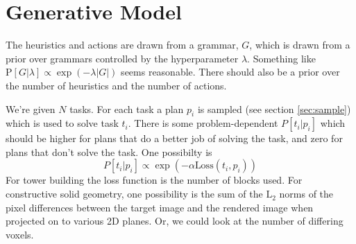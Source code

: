 \documentclass{article}
\begin{document}
\section{Generative Model}
The heuristics and actions are drawn from a grammar, $G$, which is drawn from a prior over grammars controlled by the hyperparameter $\lambda$.
Something like $\mbox{P}[G|\lambda]\propto \exp\left(-\lambda |G|\right)$ seems reasonable.
There should also be a prior over the number of heuristics and the number of actions.

We're given $N$ tasks.
For each task a plan $p_i$ is sampled (see section \ref{sec:sample})
which is used to solve task $t_i$.
There is some problem-dependent $P[t_i | p_i]$ which should be higher for plans that do a better job of solving the task, and zero for plans that don't solve the task.
One possibilty is 
\begin{equation}
P[t_i | p_i] \propto \exp\left( -\alpha \mbox{Loss}(t_i,p_i)\right)
\end{equation}
For tower building the loss function is the number of blocks used.
For constructive solid geometry, one possibility is the sum of the $\mbox{L}_2$ norms of the pixel differences between the target image and the rendered image when projected on to various 2D planes.
Or, we could look at the number of differing voxels.

\begin{figure}
\centering
{}
\end{figure}
\end{document}
